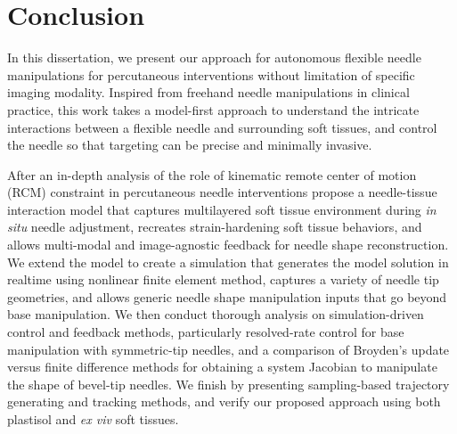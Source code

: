 \chapter{Conclusion}
\label{chap:chap-6}

In this dissertation, we present our approach for autonomous flexible needle manipulations for percutaneous interventions without limitation of specific imaging modality. Inspired from freehand needle manipulations in clinical practice, this work takes a model-first approach to understand the intricate interactions between a flexible needle and surrounding soft tissues, and control the needle so that targeting can be precise and minimally invasive.

After an in-depth analysis of the role of kinematic remote center of motion (RCM) constraint in percutaneous needle interventions   propose  a needle-tissue interaction model that captures multilayered soft tissue environment during \textit{in situ} needle adjustment, recreates strain-hardening soft tissue behaviors, and allows multi-modal and image-agnostic feedback for needle shape reconstruction. We extend the model  to create a simulation that generates the model solution in realtime using nonlinear finite element method, captures a variety of needle tip geometries, and allows generic needle shape manipulation inputs that go beyond base manipulation. We then conduct thorough analysis on simulation-driven control and feedback methods, particularly resolved-rate control for base manipulation with symmetric-tip needles, and a comparison of Broyden's update versus finite difference methods for obtaining a system Jacobian to manipulate the shape of bevel-tip needles. We finish  by presenting sampling-based trajectory generating and tracking methods, and verify our proposed approach using both plastisol and \textit{ex viv} soft tissues.

